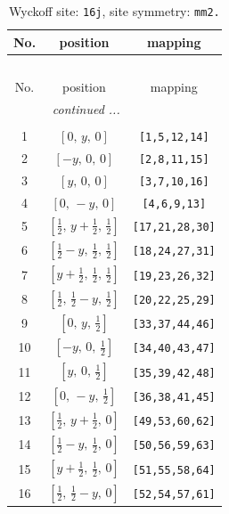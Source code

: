 \documentclass[fleqn,8pt]{jsarticle}
\begin{document}
\renewcommand{\arraystretch}{1.2}
\begin{longtable}{ccc}
\caption{Wyckoff site: {\tt 16j}, site symmetry: {\tt mm2.}}
 \\
 \hline \hline
No. & position & mapping \\ \hline \endfirsthead

\multicolumn{2}{l}{\tablename\ \thetable{}} \\
 \hline \hline
No. & position & mapping \\ \hline \endhead

 \hline \hline
\multicolumn{2}{r}{\footnotesize\it continued ...} \\ \endfoot

 \hline \hline
\multicolumn{2}{r}{} \\ \endlastfoot

1 & $\left[ 0,\, y,\, 0 \right]$ & {\tt [1,5,12,14]} \\ \hline
2 & $\left[ - y,\, 0,\, 0 \right]$ & {\tt [2,8,11,15]} \\ \hline
3 & $\left[ y,\, 0,\, 0 \right]$ & {\tt [3,7,10,16]} \\ \hline
4 & $\left[ 0,\, - y,\, 0 \right]$ & {\tt [4,6,9,13]} \\ \hline
5 & $\left[ \frac{1}{2},\, y + \frac{1}{2},\, \frac{1}{2} \right]$ & {\tt [17,21,28,30]} \\ \hline
6 & $\left[ \frac{1}{2} - y,\, \frac{1}{2},\, \frac{1}{2} \right]$ & {\tt [18,24,27,31]} \\ \hline
7 & $\left[ y + \frac{1}{2},\, \frac{1}{2},\, \frac{1}{2} \right]$ & {\tt [19,23,26,32]} \\ \hline
8 & $\left[ \frac{1}{2},\, \frac{1}{2} - y,\, \frac{1}{2} \right]$ & {\tt [20,22,25,29]} \\ \hline
9 & $\left[ 0,\, y,\, \frac{1}{2} \right]$ & {\tt [33,37,44,46]} \\ \hline
10 & $\left[ - y,\, 0,\, \frac{1}{2} \right]$ & {\tt [34,40,43,47]} \\ \hline
11 & $\left[ y,\, 0,\, \frac{1}{2} \right]$ & {\tt [35,39,42,48]} \\ \hline
12 & $\left[ 0,\, - y,\, \frac{1}{2} \right]$ & {\tt [36,38,41,45]} \\ \hline
13 & $\left[ \frac{1}{2},\, y + \frac{1}{2},\, 0 \right]$ & {\tt [49,53,60,62]} \\ \hline
14 & $\left[ \frac{1}{2} - y,\, \frac{1}{2},\, 0 \right]$ & {\tt [50,56,59,63]} \\ \hline
15 & $\left[ y + \frac{1}{2},\, \frac{1}{2},\, 0 \right]$ & {\tt [51,55,58,64]} \\ \hline
16 & $\left[ \frac{1}{2},\, \frac{1}{2} - y,\, 0 \right]$ & {\tt [52,54,57,61]} \\
\end{longtable}
\end{document}
